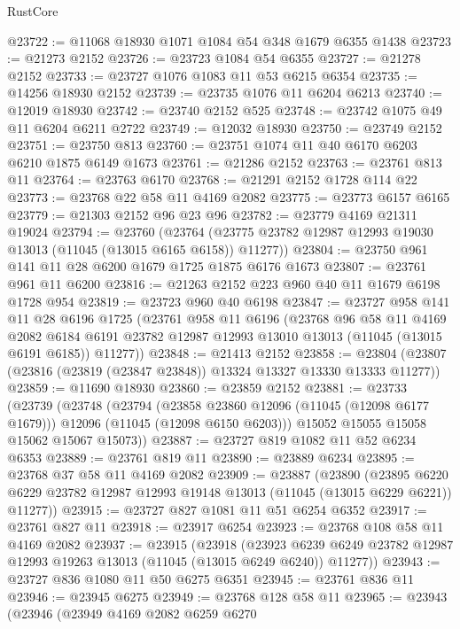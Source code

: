\begin{lexlean}{RustCore}
\begin{coremodule}
@23722 := @11068 @18930 @1071 @1084 @54 @348 @1679 @6355 @1438
@23723 := @21273 @2152
@23726 := @23723 @1084 @54 @6355
@23727 := @21278 @2152
@23733 := @23727 @1076 @1083 @11 @53 @6215 @6354
@23735 := @14256 @18930 @2152
@23739 := @23735 @1076 @11 @6204 @6213
@23740 := @12019 @18930
@23742 := @23740 @2152 @525
@23748 := @23742 @1075 @49 @11 @6204 @6211 @2722
@23749 := @12032 @18930
@23750 := @23749 @2152
@23751 := @23750 @813
@23760 := @23751 @1074 @11 @40 @6170 @6203 @6210 @1875 @6149 @1673
@23761 := @21286 @2152
@23763 := @23761 @813 @11
@23764 := @23763 @6170
@23768 := @21291 @2152 @1728 @114 @22
@23773 := @23768 @22 @58 @11 @4169 @2082
@23775 := @23773 @6157 @6165
@23779 := @21303 @2152 @96 @23 @96
@23782 := @23779 @4169 @21311 @19024
@23794 := @23760
    (@23764 (@23775 @23782 @12987 @12993 @19030 @13013 (@11045 (@13015 @6165 @6158)) @11277))
@23804 := @23750 @961 @141 @11 @28 @6200 @1679 @1725 @1875 @6176 @1673
@23807 := @23761 @961 @11 @6200
@23816 := @21263 @2152 @223 @960 @40 @11 @1679 @6198 @1728 @954
@23819 := @23723 @960 @40 @6198
@23847 := @23727
    @958
    @141
    @11
    @28
    @6196
    @1725
    (@23761
      @958
      @11
      @6196
      (@23768
        @96
        @58
        @11
        @4169
        @2082
        @6184
        @6191
        @23782
        @12987
        @12993
        @13010
        @13013
        (@11045 (@13015 @6191 @6185))
        @11277))
@23848 := @21413 @2152
@23858 := @23804 (@23807 (@23816 (@23819 (@23847 @23848)) @13324 @13327 @13330 @13333 @11277))
@23859 := @11690 @18930
@23860 := @23859 @2152
@23881 := @23733
    (@23739
      (@23748
        (@23794
          (@23858 @23860 @12096 (@11045 (@12098 @6177 @1679)))
          @12096
          (@11045 (@12098 @6150 @6203)))
        @15052
        @15055
        @15058
        @15062
        @15067
        @15073))
@23887 := @23727 @819 @1082 @11 @52 @6234 @6353
@23889 := @23761 @819 @11
@23890 := @23889 @6234
@23895 := @23768 @37 @58 @11 @4169 @2082
@23909 := @23887
    (@23890
      (@23895 @6220 @6229 @23782 @12987 @12993 @19148 @13013 (@11045 (@13015 @6229 @6221)) @11277))
@23915 := @23727 @827 @1081 @11 @51 @6254 @6352
@23917 := @23761 @827 @11
@23918 := @23917 @6254
@23923 := @23768 @108 @58 @11 @4169 @2082
@23937 := @23915
    (@23918
      (@23923 @6239 @6249 @23782 @12987 @12993 @19263 @13013 (@11045 (@13015 @6249 @6240)) @11277))
@23943 := @23727 @836 @1080 @11 @50 @6275 @6351
@23945 := @23761 @836 @11
@23946 := @23945 @6275
@23949 := @23768 @128 @58 @11
@23965 := @23943
    (@23946
      (@23949
        @4169
        @2082
        @6259
        @6270

\end{coremodule}
\end{lexlean}
